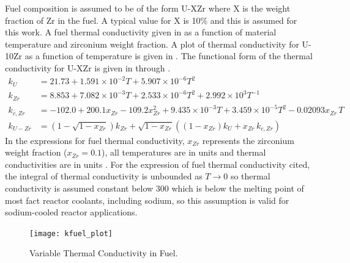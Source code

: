   Fuel composition is assumed to be of the form U-XZr where
  X is the weight fraction of Zr in the fuel. A typical value for X is 10\% and
  this is assumed for this work.
  A fuel thermal conductivity given in \cite{fuelProp} as a function of material
  temperature and zirconium weight fraction.
  A plot of thermal conductivity for U-10Zr as a function of temperature is 
  given in . The functional form of the thermal
  conductivity for U-XZr is given in  through
  .
  \begin{align}
    \label{eq:kfuel_first}
    k_U      &= 21.73 + 1.591 \times 10^{-2} T + 5.907 \times 10^{-6} T^2 \\
    k_{Zr}   &= 8.853 + 7.082 \times 10^{-3} T + 2.533 \times 10^{-6} T^2 +
      2.992 \times 10^{3} T^{-1} \\
    k_{c,Zr} &= -102.0 + 200.1 x_{Zr} - 109.2 x_{Zr}^2 + 
      9.435 \times 10^{-3} T + 3.459 \times 10^{-5} T^2 - 0.02093 x_{Zr} \, T \\
    \label{eq:kfuel_last}
    k_{U-Zr} &= \left( 1 - \sqrt{1-x_{Zr}}\right) k_{Zr} + 
      \sqrt{1 - x_{Zr}} \left( \left( 1 - x_{Zr}\right) k_U + x_{Zr} \, k_{c,Zr}
      \right) 
  \end{align}
  In the expressions for fuel thermal conductivity, $x_{Zr}$ represents the 
  zirconium weight fraction ($x_{Zr} = 0.1$), all temperatures are in
  units  and thermal conductivities are in units 
  .
  For the expression of fuel thermal 
  conductivity cited, the integral of thermal conductivity is unbounded as 
  $T \rightarrow 0$ so thermal conductivity is assumed constant below 300 
   which is below the melting point of most fact reactor coolants,
  including sodium, so this assumption is valid for sodium-cooled reactor
  applications.

  \begin{figure}
    \centering
    \texttt{[image: kfuel\_plot]}
    \caption{Variable Thermal Conductivity in Fuel.}
    \label{fig:kfuel_plot}
  \end{figure}

